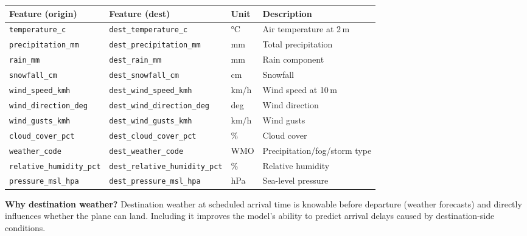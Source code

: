 \documentclass{article}
\newcommand{\code}[1]{\texttt{\small #1}}
\begin{document}
\begin{tcolorbox}[mainbox, title={Weather Feature Descriptions}]
\renewcommand{\arraystretch}{1.3}
\begin{tabularx}{\textwidth}{L{3.8cm} L{3.8cm} L{1.4cm} X}
    \toprule
    \textbf{Feature (origin)} & \textbf{Feature (dest)} & \textbf{Unit} & \textbf{Description} \\
    \midrule
    \code{temperature\_c}          & \code{dest\_temperature\_c}          & °C   & Air temperature at 2\,m \\
    \code{precipitation\_mm}       & \code{dest\_precipitation\_mm}       & mm   & Total precipitation \\
    \code{rain\_mm}                & \code{dest\_rain\_mm}                & mm   & Rain component \\
    \code{snowfall\_cm}            & \code{dest\_snowfall\_cm}            & cm   & Snowfall \\
    \code{wind\_speed\_kmh}        & \code{dest\_wind\_speed\_kmh}        & km/h & Wind speed at 10\,m \\
    \code{wind\_direction\_deg}    & \code{dest\_wind\_direction\_deg}    & deg  & Wind direction \\
    \code{wind\_gusts\_kmh}        & \code{dest\_wind\_gusts\_kmh}        & km/h & Wind gusts \\
    \code{cloud\_cover\_pct}       & \code{dest\_cloud\_cover\_pct}       & \%   & Cloud cover \\
    \code{weather\_code}           & \code{dest\_weather\_code}           & WMO  & Precipitation/fog/storm type \\
    \code{relative\_humidity\_pct} & \code{dest\_relative\_humidity\_pct} & \%   & Relative humidity \\
    \code{pressure\_msl\_hpa}      & \code{dest\_pressure\_msl\_hpa}      & hPa  & Sea-level pressure \\
    \bottomrule
\end{tabularx}
\end{tcolorbox}

\begin{tcolorbox}[quotebox]
\textbf{Why destination weather?} Destination weather at scheduled arrival time is knowable before departure (weather forecasts) and directly influences whether the plane can land. Including it improves the model's ability to predict arrival delays caused by destination-side conditions.
\end{tcolorbox}
\end{document}
